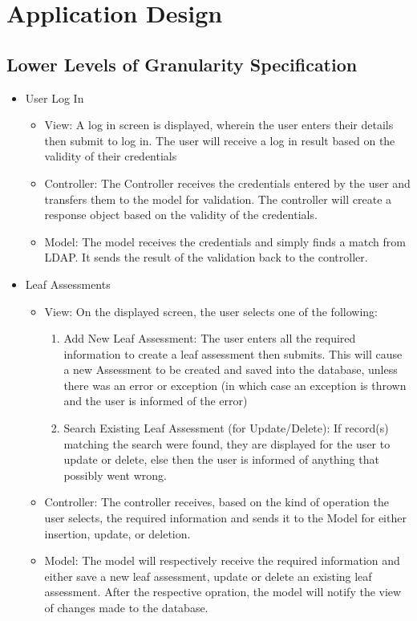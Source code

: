 \documentclass[12pt]{article}
\begin{document}
			
	\section{Application Design}
			\vspace{0.2in}
					
		\subsection{Lower Levels of Granularity Specification}
				\begin{itemize}
					\item User Log In
						\begin{itemize}
						\item View: A log in screen is displayed, wherein the user enters their details then submit to log in. The user will receive a log in result based on the validity of their credentials
						\item Controller: The Controller receives the credentials entered by the user and transfers them to the model for validation. The controller will create a response object based on the validity of the credentials.
						\item Model: The model receives the credentials and simply finds a match from LDAP. It sends the result of the validation back to the controller.
						\end{itemize}
						
					\item Leaf Assessments
					\begin{itemize}
						\item View: On the displayed screen, the user selects one of the following:
						\begin{enumerate}
							\item Add New Leaf Assessment: The user enters all the required information to create a leaf assessment then submits. This will cause a new Assessment to be created and saved into the database, unless there was an error or exception (in which case an exception is thrown and the user is informed of the error)
							\item Search Existing Leaf Assessment (for Update/Delete): If record(s) matching the search were found, they are displayed for the user to update or delete, else then the user is informed of anything that possibly went wrong.
						\end{enumerate}
						\item Controller: The controller receives, based on the kind of operation the user selects, the required information and sends it to the Model for either insertion, update, or deletion.
						\item Model: The model will respectively receive the required information and either save a new leaf assessment, update or delete an existing leaf assessment. After the respective opration, the model will notify the view of changes made to the database.
						

\end{itemize}
\end{itemize}
\end{document}
